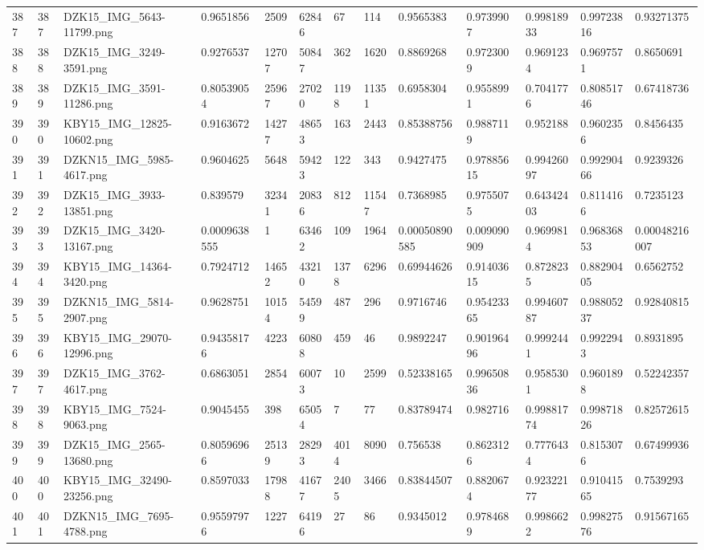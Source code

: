 \documentclass[11pt, a4paper, twoside]{report}
\begin{document}
\begin{longtable}[c]{@{}lllllllllllll@{}}
387 & 387 & DZK15\_IMG\_5643-11799.png & 0.9651856 & 2509 & 62846 & 67 & 114 & 0.9565383 & 0.9739907 & 0.99818933 & 0.99723816 & 0.93271375 \\
388 & 388 & DZK15\_IMG\_3249-3591.png & 0.9276537 & 12707 & 50847 & 362 & 1620 & 0.8869268 & 0.9723009 & 0.9691234 & 0.9697571 & 0.8650691 \\
389 & 389 & DZK15\_IMG\_3591-11286.png & 0.80539054 & 25967 & 27020 & 1198 & 11351 & 0.6958304 & 0.9558991 & 0.7041776 & 0.80851746 & 0.67418736 \\
390 & 390 & KBY15\_IMG\_12825-10602.png & 0.9163672 & 14277 & 48653 & 163 & 2443 & 0.85388756 & 0.9887119 & 0.952188 & 0.9602356 & 0.8456435 \\
391 & 391 & DZKN15\_IMG\_5985-4617.png & 0.9604625 & 5648 & 59423 & 122 & 343 & 0.9427475 & 0.97885615 & 0.99426097 & 0.99290466 & 0.9239326 \\
392 & 392 & DZK15\_IMG\_3933-13851.png & 0.839579 & 32341 & 20836 & 812 & 11547 & 0.7368985 & 0.9755075 & 0.64342403 & 0.8114166 & 0.7235123 \\
393 & 393 & DZK15\_IMG\_3420-13167.png & 0.0009638555 & 1 & 63462 & 109 & 1964 & 0.00050890585 & 0.009090909 & 0.9699814 & 0.96836853 & 0.00048216007 \\
394 & 394 & KBY15\_IMG\_14364-3420.png & 0.7924712 & 14652 & 43210 & 1378 & 6296 & 0.69944626 & 0.91403615 & 0.8728235 & 0.88290405 & 0.6562752 \\
395 & 395 & DZKN15\_IMG\_5814-2907.png & 0.9628751 & 10154 & 54599 & 487 & 296 & 0.9716746 & 0.95423365 & 0.99460787 & 0.98805237 & 0.92840815 \\
396 & 396 & KBY15\_IMG\_29070-12996.png & 0.94358176 & 4223 & 60808 & 459 & 46 & 0.9892247 & 0.90196496 & 0.9992441 & 0.9922943 & 0.8931895 \\
397 & 397 & DZK15\_IMG\_3762-4617.png & 0.6863051 & 2854 & 60073 & 10 & 2599 & 0.52338165 & 0.99650836 & 0.9585301 & 0.9601898 & 0.52242357 \\
398 & 398 & KBY15\_IMG\_7524-9063.png & 0.9045455 & 398 & 65054 & 7 & 77 & 0.83789474 & 0.982716 & 0.99881774 & 0.99871826 & 0.82572615 \\
399 & 399 & DZK15\_IMG\_2565-13680.png & 0.80596966 & 25139 & 28293 & 4014 & 8090 & 0.756538 & 0.8623126 & 0.7776434 & 0.8153076 & 0.67499936 \\
400 & 400 & KBY15\_IMG\_32490-23256.png & 0.8597033 & 17988 & 41677 & 2405 & 3466 & 0.83844507 & 0.8820674 & 0.92322177 & 0.91041565 & 0.7539293 \\
401 & 401 & DZKN15\_IMG\_7695-4788.png & 0.95597976 & 1227 & 64196 & 27 & 86 & 0.9345012 & 0.9784689 & 0.9986622 & 0.99827576 & 0.91567165 \\

\end{longtable}
\end{document}
